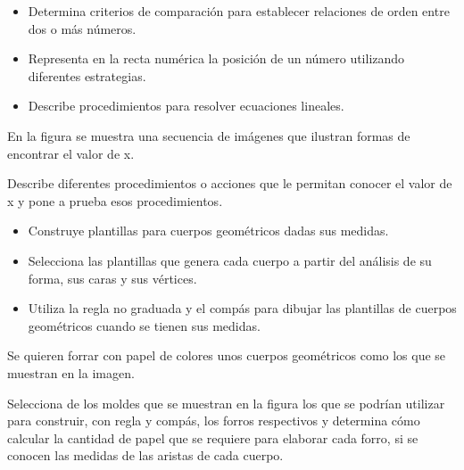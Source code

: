
\evidencias

\begin{itemize}
  \item Determina criterios de comparación para establecer relaciones de orden entre dos o más números.
  \item Representa en la recta numérica la posición de un número utilizando diferentes estrategias.
  \item Describe procedimientos para resolver ecuaciones lineales.
\end{itemize}

\ejemplo

En la figura se muestra una secuencia de imágenes que ilustran formas de encontrar el valor de x.


Describe diferentes procedimientos o acciones que le permitan conocer el valor de x y pone a prueba esos procedimientos.


\evidencias

\begin{itemize}
  \item Construye plantillas para cuerpos geométricos dadas sus medidas.
  \item Selecciona las plantillas que genera cada cuerpo a partir del análisis de su forma, sus caras y sus vértices.
  \item Utiliza la regla no graduada y el compás para dibujar las plantillas de cuerpos geométricos cuando se tienen sus medidas.
\end{itemize}

\ejemplo

Se quieren forrar con papel de colores unos cuerpos geométricos como los que se muestran en la imagen.


Selecciona de los moldes que se muestran en la figura los que se podrían utilizar para construir, con regla y compás, los forros respectivos y determina cómo calcular la cantidad de papel que se requiere para elaborar cada forro, si se conocen las medidas de las aristas de cada cuerpo.


